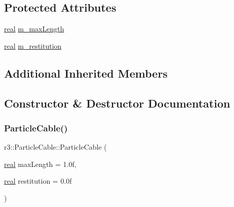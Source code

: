 \subsection*{Protected Attributes}
\begin{DoxyCompactItemize}
\item 
\mbox{\hyperlink{namespacer3_ab2016b3e3f743fb735afce242f0dc1eb}{real}} \mbox{\hyperlink{classr3_1_1_particle_cable_a168d7ed5047dc94ae73f7eec4929ab4d}{m\+\_\+max\+Length}}
\item 
\mbox{\hyperlink{namespacer3_ab2016b3e3f743fb735afce242f0dc1eb}{real}} \mbox{\hyperlink{classr3_1_1_particle_cable_ad03466bf1aeecddec5fd0319be7b2e3d}{m\+\_\+restitution}}
\end{DoxyCompactItemize}
\subsection*{Additional Inherited Members}


\subsection{Constructor \& Destructor Documentation}
\mbox{\label{classr3_1_1_particle_cable_afcb568750f7430ec94e34942f766e087}} 
\subsubsection{\texorpdfstring{Particle\+Cable()}{ParticleCable()}}
{\footnotesize\ttfamily r3\+::\+Particle\+Cable\+::\+Particle\+Cable (\begin{DoxyParamCaption}\item[{\mbox{\hyperlink{namespacer3_ab2016b3e3f743fb735afce242f0dc1eb}{real}}}]{max\+Length = {\ttfamily 1.0f},  }\item[{\mbox{\hyperlink{namespacer3_ab2016b3e3f743fb735afce242f0dc1eb}{real}}}]{restitution = {\ttfamily 0.0f} }\end{DoxyParamCaption})\hspace{0.3cm}{\ttfamily [explicit]}}

\mbox{\label{classr3_1_1_particle_cable_a4ba107749641635a5d7b670eab78c371}} 
